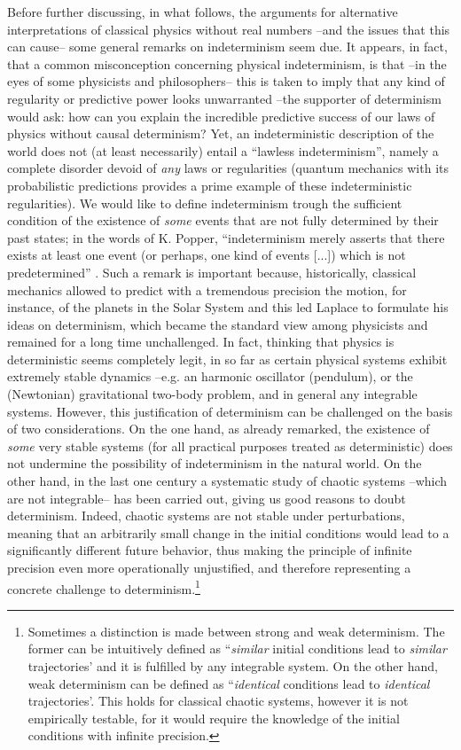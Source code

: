 \documentclass[12pt]{article}
\begin{document}
Before further discussing, in what follows, the arguments for alternative interpretations of classical physics without real numbers --and the issues that this can cause-- some general remarks on indeterminism seem due. It appears, in fact, that a common misconception concerning physical indeterminism, is that --in the eyes of some physicists and philosophers-- this is taken to imply that any kind of regularity or predictive power looks unwarranted --the supporter of determinism would ask: how can you explain the incredible predictive success of our laws of physics without causal determinism? Yet, an indeterministic description of the world does not (at least necessarily) entail a ``lawless indeterminism'', namely a complete disorder devoid of \emph{any} laws or regularities (quantum mechanics with its probabilistic predictions provides a prime example of these indeterministic regularities). We would like to define indeterminism trough the sufficient condition of the existence of \emph{some} events that are not fully determined by their past states; in the words of K. Popper, ``indeterminism merely asserts that there exists at least one event (or perhaps, one kind of events [...]) which is not predetermined'' \cite{popper50}. Such a remark is important because, historically, classical mechanics allowed to predict with a tremendous precision the motion, for instance, of the planets in the Solar System and this led Laplace to formulate his ideas on determinism, which became the standard view among physicists and remained for a long time unchallenged. In fact, thinking that physics is deterministic seems completely legit, in so far as certain physical systems exhibit extremely stable dynamics --e.g. an harmonic oscillator (pendulum), or the (Newtonian) gravitational two-body problem, and in general any integrable systems.  However, this justification of determinism can be challenged on the basis of two considerations. On the one hand, as already remarked, the existence of \emph{some} very stable systems (for all practical purposes treated as deterministic) does not undermine the possibility of indeterminism in the natural world. On the other hand, in the last one century a systematic study of chaotic systems --which are not integrable-- has been carried out, giving us good reasons to doubt determinism. Indeed, chaotic systems are not stable under perturbations, meaning that an arbitrarily small change in the initial conditions would lead to a significantly different future behavior, thus making the principle of infinite precision even more operationally unjustified, and therefore representing a concrete challenge to determinism.\footnote{Sometimes a distinction is made between strong and weak determinism. The former can be intuitively defined as ``\emph{similar} initial conditions lead to \emph{similar} trajectories’ and it is fulfilled by any integrable system. On the other hand, weak determinism can be defined as ``\emph{identical} conditions lead to \emph{identical} trajectories’. This holds for classical chaotic systems, however it is not empirically testable, for it would require the knowledge of the initial conditions with infinite precision.}
\end{document}
